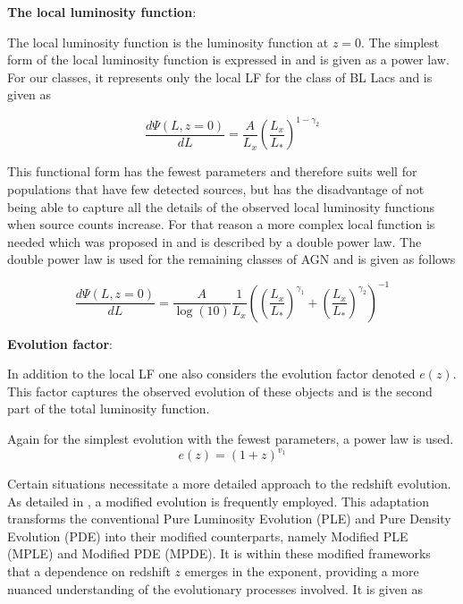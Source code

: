 \textbf{The local luminosity function}:

The local luminosity function is the luminosity function at $z=0$.
The simplest form of the local luminosity function is expressed in \cite{Ajello_2009} and is given as a power law. For our classes, it represents only the local LF for the class of BL Lacs 
and is given as

\begin{equation}
    \frac{d\Psi(L,z=0)}{dL} = \frac{A}{L_x} \left( \frac{L_x}{L_*}\right)^{1-\gamma_2}
\end{equation}

This functional form has the fewest parameters and therefore suits well for populations that have few detected sources, but has the disadvantage of not being able to capture all the details of the observed local luminosity functions when source counts increase.
For that reason a more complex local function is needed which was proposed in \cite{Ueda_2003} and is described by a double power law.
The double power law is used for the remaining classes of AGN and is given as follows


   
\begin{equation}
    \frac{d\Psi(L,z=0)}{dL} =  \frac{A}{\log(10)} \frac{1}{L_x} \left( \left( \frac{L_x}{L_*} \right)^{\gamma_1} + \left( \frac{L_x}{L_*} \right)^{\gamma_2} \right)^{-1}
\end{equation}



\textbf{Evolution factor}:

In addition to the local LF one also considers the evolution factor denoted $e(z)$. This factor captures the observed evolution of these objects and is the second part of the total luminosity function.

Again for the simplest evolution with the fewest parameters, a power law is used.
 $$
e(z) = (1 + z)^{v_1 }
 $$


  
Certain situations necessitate a more detailed approach to the redshift evolution. 
 As detailed in \cite{Ajello_2009}, a modified evolution is frequently employed. 
 This adaptation transforms the conventional Pure Luminosity Evolution (PLE) and Pure Density Evolution 
 (PDE) into their modified counterparts, namely Modified PLE (MPLE) and Modified PDE (MPDE).
It is within these modified frameworks that a dependence on redshift $z$ emerges in the exponent,
providing a more nuanced understanding of the evolutionary processes involved. It is given as


